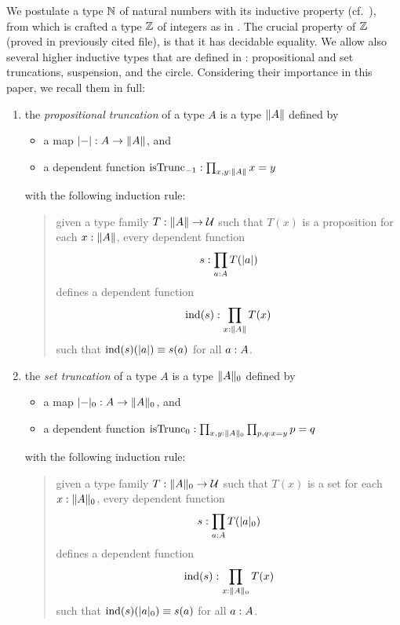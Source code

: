 \documentclass[english,a4paper]{lmcs}
\def\githubpath{\tt\small}
\begin{document}
We postulate a type $\mathbb{N}$ of natural numbers with its inductive property
(cf.~\cite[Chapter 1.9]{HoTT}), from which is crafted a type $\mathbb{Z}$ of integers
as in \cite[\githubpath core/lib/types/Int.agda]{hott-agda}. The crucial
property of $\mathbb{Z}$ (proved in previously cited file), is that it has decidable
equality. We allow also several higher inductive types that are defined in
\cite{HoTT}: propositional and set truncations, suspension, and the circle.
Considering their importance in this paper, we recall them in full:
\begin{enumerate}
\item the \emph{propositional truncation} of a type $A$ is a type $\lVert A\rVert$
  defined by
  \begin{itemize}
  \item a map $\lvert\mathord{{-}}\rvert : A \to \lVert A\rVert$, and
  \item a dependent function
    $\mathrm{isTrunc}_{-1} : \prod_{x,y: \lVert A\rVert} x=y$
  \end{itemize}
  with the following induction rule:
  \begin{quote}
    given a type family $T: \lVert A\rVert \to \mathcal{U}$ such that
    $T(x)$ is a proposition for each $x: \lVert A\rVert$, every
    dependent function
    \begin{displaymath}
      s: \prod_{a: A}T(\lvert a\rvert)
    \end{displaymath}
    defines a dependent function
    \begin{displaymath}
      \operatorname{\mathrm{ind}}(s):\prod_{x: \lVert A\rVert} T(x)
    \end{displaymath}
    such that $\operatorname{\mathrm{ind}}(s)(\lvert a\rvert) \equiv s(a)$ for all $a: A$.
  \end{quote}
\item the \emph{set truncation} of a type $A$ is a type $\lVert A\rVert_0$
  defined by
  \begin{itemize}
  \item a map $\lvert\mathord{{-}}\rvert_0 : A \to \lVert A\rVert_0$, and
  \item a dependent function
    $\mathrm{isTrunc}_{0} : \prod_{x,y: \lVert A\rVert_0}\prod_{p,q: x=y} p = q$
  \end{itemize}
  with the following induction rule:
  \begin{quote}
    given a type family $T: \lVert A\rVert_0 \to \mathcal{U}$ such that
    $T(x)$ is a set for each $x: \lVert A\rVert_0$, every
    dependent function
    \begin{displaymath}
      s: \prod_{a: A}T(\lvert a\rvert_0)
    \end{displaymath}
    defines a dependent function
    \begin{displaymath}
      \operatorname{\mathrm{ind}}(s):\prod_{x: \lVert A\rVert_0} T(x)
    \end{displaymath}
    such that $\operatorname{\mathrm{ind}}(s)(\lvert a\rvert_0) \equiv s(a)$ for all $a: A$.
  \end{quote}


\end{enumerate}
\end{document}
